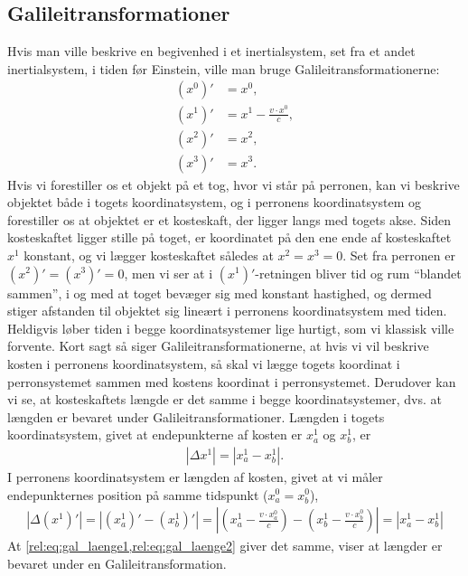\documentclass[crop=false, class=memoir]{standalone}
\begin{document}
\subsection{Galileitransformationer}

Hvis man ville beskrive en begivenhed i et inertialsystem, set fra et andet inertialsystem, i tiden før Einstein, ville man bruge Galileitransformationerne:
%
\begin{subequations} \label{rel:eq:galilei}
\begin{align}
    \left(x^0\right)' &= x^0, \\
    \left(x^1\right)' &= x^1 - \frac{v\cdot x^0}{c}, \\
    \left(x^2\right)' &= x^2, \\
    \left(x^3\right)' &= x^3. 
\end{align}
\end{subequations}
%
Hvis vi forestiller os et objekt på et tog, hvor vi står på perronen, kan vi beskrive objektet både i togets koordinatsystem, og i perronens koordinatsystem og forestiller os at objektet er et kosteskaft, der ligger langs med togets akse. Siden kosteskaftet ligger stille på toget, er koordinatet på den ene ende af kosteskaftet $x^1$ konstant, og vi lægger kosteskaftet således at $x^2 = x^3 = 0$. Set fra perronen er $\left(x^2\right)' = \left(x^3\right)' = 0$, men vi ser at i $\left(x^1\right)'$-retningen bliver tid og rum ``blandet sammen'', i og med at toget bevæger sig med konstant hastighed, og dermed stiger afstanden til objektet sig lineært i perronens koordinatsystem med tiden. Heldigvis løber tiden i begge koordinatsystemer lige hurtigt, som vi klassisk ville forvente. Kort sagt så siger Galileitransformationerne, at hvis vi vil beskrive kosten i perronens koordinatsystem, så skal vi lægge togets koordinat i perronsystemet sammen med kostens koordinat i perronsystemet.
%
Derudover kan vi se, at kosteskaftets længde er det samme i begge koordinatsystemer, dvs. at længden er bevaret under Galileitransformationer. Længden i togets koordinatsystem, givet at endepunkterne af kosten er $x^1_a$ og $x^1_b$, er 
%
\begin{align} \label{rel:eq:gal_laenge1}
    \left| \Delta{x^1} \right| = \left| x^1_a - x^1_b \right|.
\end{align}
%
I perronens koordinatsystem er længden af kosten, givet at vi måler endepunkternes position på samme tidspunkt ($x^0_a = x^0_b$),
%
\begin{align} \label{rel:eq:gal_laenge2}
    \left| \Delta\left(x^1\right)' \right| = \left| \left(x^1_a\right)' - \left(x^1_b\right)' \right| = \left| \left( x^1_a - \frac{v\cdot x^0_a}{c} \right) - \left( x^1_b - \frac{v\cdot x^0_b}{c} \right) \right|  = \left| x^1_a - x^1_b \right|
\end{align}
%
At \cref{rel:eq:gal_laenge1,rel:eq:gal_laenge2} giver det samme, viser at længder er bevaret under en Galileitransformation.
\end{document}
